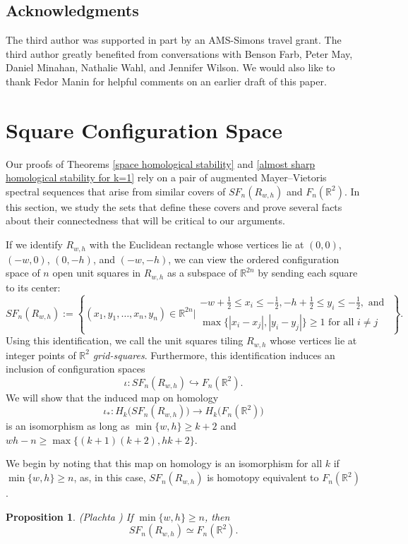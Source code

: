 \documentclass[pagebackref,colorlinks,citecolor=blue,linkcolor=blue,urlcolor=blue,filecolor=blue]{article}
\newtheorem{prop}[thm]{Proposition}
\theoremstyle{definition}\newtheorem{definition}[thm]{Definition}
\theoremstyle{definition}
\newcommand{\R}{\ensuremath{\mathbb{R}}}
\begin{document}
\subsection{Acknowledgments}
The third author was supported in part by an AMS-Simons travel grant.
The third author greatly benefited from conversations with Benson Farb, Peter May, Daniel Minahan, Nathalie Wahl, and Jennifer Wilson.
We would also like to thank Fedor Manin for helpful comments on an earlier draft of this paper.

\section{Square Configuration Space}\label{Square Configuration Space}
Our proofs of Theorems \ref{space homological stability} and \ref{almost sharp homological stability for k=1} rely on a pair of augmented Mayer--Vietoris spectral sequences that arise from similar covers of $SF_{n}(R_{w,h})$ and $F_{n}(\R^{2})$.
In this section, we study the sets that define these covers and prove several facts about their connectedness that will be critical to our arguments.

If we identify $R_{w,h}$ with the Euclidean rectangle whose vertices lie at $(0,0)$, $(-w, 0)$, $(0, -h)$, and $(-w,-h)$, we can view the ordered configuration space of $n$ open unit squares in $R_{w,h}$ as a subspace of $\R^{2n}$ by sending each square to its center:
\[
SF_{n}(R_{w,h}):=\left\{(x_{1}, y_{1},\dots, x_{n}, y_{n})\in \R^{2n}\bigg|\substack{{\displaystyle-w+\frac{1}{2}\le x_i\le -\frac{1}{2}, -h+\frac{1}{2}\le y_i\le -\frac{1}{2}, \text{ and }}\\\displaystyle\max\{|x_{i}-x_{j}|, |y_{i}-y_{j}|\}\ge 1\text{ for all }i\neq j}\right\}.
\]
Using this identification, we call the unit squares tiling $R_{w,h}$ whose vertices lie at integer points of $\R^{2}$ \emph{grid-squares}.
Furthermore, this identification induces an inclusion of configuration spaces
\[
\iota:SF_{n}(R_{w,h}) \hookrightarrow F_{n}(\R^{2}).
\]
We will show that the induced map on homology
\[
\iota_{*}:H_{k}\big(SF_{n}(R_{w,h})\big)\to H_{k}\big(F_{n}(\R^{2})\big)
\]
is an isomorphism as long as $\min\{w, h\}\ge k+2$ and $wh-n\ge \max\big\{(k+1)(k+2), hk+2\big\}$.

We begin by noting that this map on homology is an isomorphism for all $k$ if $\min\{w,h\}\ge n$, as, in this case, $SF_{n}(R_{w,h})$ is homotopy equivalent to $F_{n}(\R^{2})$.

\begin{prop}\label{homotopy equivalence}
(Plachta \cite[Corollary 17]{plachta2021configuration})
If $\min\{w,h\}\ge n$, then
\[
SF_{n}(R_{w,h})\simeq F_{n}(\R^{2}).
\]
\end{prop}
\end{document}
